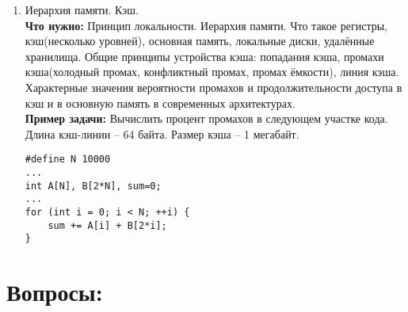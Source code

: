 \documentclass{article}
\begin{document}
\begin{enumerate}
\item Иерархия памяти. Кэш. \\
\textbf{Что нужно:} Принцип локальности. Иерархия памяти. Что такое регистры, кэш(несколько уровней), основная память, локальные диски, удалённые хранилища. Общие принципы устройства кэша: попадания кэша, промахи кэша(холодный промах, конфликтный промах, промах ёмкости), линия кэша. Характерные значения вероятности промахов и продолжительности доступа в кэш и в основную память в современных архитектурах.    \\
\textbf{Пример задачи:} Вычислить процент промахов в следующем участке кода. Длина кэш-линии -- 64 байта. Размер кэша -- 1 мегабайт.\\
\begin{verbatim}
#define N 10000
...
int A[N], B[2*N], sum=0;
...
for (int i = 0; i < N; ++i) {
    sum += A[i] + B[2*i];
}
\end{verbatim}


\end{enumerate}



\iffalse
\section*{Вопросы:}
\end{document}
